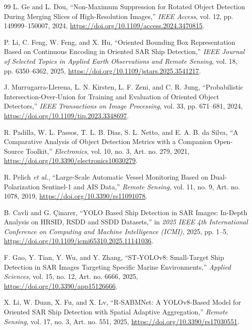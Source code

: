 \documentclass[conference]{IEEEtran}
\begin{document}
\begin{thebibliography}{99}
	 L. Ge and L. Dou, ``Non-Maximum Suppression for Rotated Object Detection During Merging Slices of High-Resolution Images,'' \emph{IEEE Access}, vol. 12, pp. 149999--150007, 2024, \url{https://doi.org/10.1109/access.2024.3470815}.

	 P. Li, C. Feng, W. Feng, and X. Hu, ``Oriented Bounding Box Representation Based on Continuous Encoding in Oriented SAR Ship Detection,'' \emph{IEEE Journal of Selected Topics in Applied Earth Observations and Remote Sensing}, vol. 18, pp. 6350--6362, 2025, \url{https://doi.org/10.1109/jstars.2025.3541217}.

	 J. Murrugarra-Llerena, L. N. Kirsten, L. F. Zeni, and C. R. Jung, ``Probabilistic Intersection-Over-Union for Training and Evaluation of Oriented Object Detectors,'' \emph{IEEE Transactions on Image Processing}, vol. 33, pp. 671--681, 2024, \url{https://doi.org/10.1109/tip.2023.3348697}.

	 R. Padilla, W. L. Passos, T. L. B. Dias, S. L. Netto, and E. A. B. da Silva, ``A Comparative Analysis of Object Detection Metrics with a Companion Open-Source Toolkit,'' \emph{Electronics}, vol. 10, no. 3, Art. no. 279, 2021, \url{https://doi.org/10.3390/electronics10030279}.

	 R. Pelich \textit{et al.}, ``Large-Scale Automatic Vessel Monitoring Based on Dual-Polarization Sentinel-1 and AIS Data,'' \emph{Remote Sensing}, vol. 11, no. 9, Art. no. 1078, 2019, \url{https://doi.org/10.3390/rs11091078}.

	 B. Cavli and G. Çinarer, ``YOLO Based Ship Detection in SAR Images: In-Depth Analysis on HRSID, RSDD and SSDD Datasets,'' in \emph{2025 IEEE 4th International Conference on Computing and Machine Intelligence (ICMI)}, 2025, pp. 1--5, \url{https://doi.org/10.1109/icmi65310.2025.11141036}.

	 F. Gao, Y. Tian, Y. Wu, and Y. Zhang, ``ST-YOLOv8: Small-Target Ship Detection in SAR Images Targeting Specific Marine Environments,'' \emph{Applied Sciences}, vol. 15, no. 12, Art. no. 6666, 2025, \url{https://doi.org/10.3390/app15126666}.

	 X. Li, W. Duan, X. Fu, and X. Lv, ``R-SABMNet: A YOLOv8-Based Model for Oriented SAR Ship Detection with Spatial Adaptive Aggregation,'' \emph{Remote Sensing}, vol. 17, no. 3, Art. no. 551, 2025, \url{https://doi.org/10.3390/rs17030551}.


\end{thebibliography}
\end{document}
